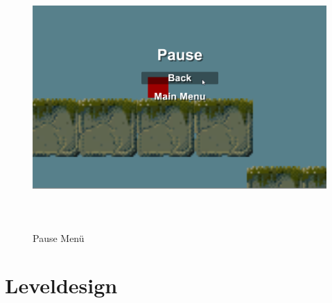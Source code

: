 \begin{figure}[H]
	\includegraphics[height=10cm]{images/PauseMenu.png}
	\caption{Pause Menü}
\end{figure}

\section{Leveldesign}
